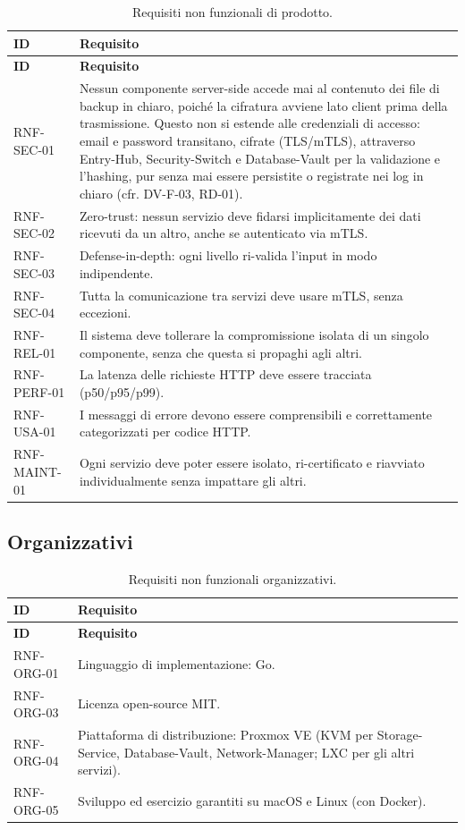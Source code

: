 \begin{longtable}{p{2.6cm} p{\dimexpr\linewidth-2.6cm-4\tabcolsep\relax}}
\caption{Requisiti non funzionali di prodotto.} \\
\hline
\textbf{ID} & \textbf{Requisito} \\
\hline
\endfirsthead
\hline
\textbf{ID} & \textbf{Requisito} \\
\hline
\endhead
\hline
\endfoot
\hline
\endlastfoot
RNF-SEC-01 & Nessun componente server-side accede mai al contenuto dei file di backup in chiaro, poiché la cifratura avviene lato client prima della trasmissione. Questo non si estende alle credenziali di accesso: email e password transitano, cifrate (TLS/mTLS), attraverso Entry-Hub, Security-Switch e Database-Vault per la validazione e l'hashing, pur senza mai essere persistite o registrate nei log in chiaro (cfr. DV-F-03, RD-01). \\
RNF-SEC-02 & Zero-trust: nessun servizio deve fidarsi implicitamente dei dati ricevuti da un altro, anche se autenticato via mTLS. \\
RNF-SEC-03 & Defense-in-depth: ogni livello ri-valida l'input in modo indipendente. \\
RNF-SEC-04 & Tutta la comunicazione tra servizi deve usare mTLS, senza eccezioni. \\
RNF-REL-01 & Il sistema deve tollerare la compromissione isolata di un singolo componente, senza che questa si propaghi agli altri. \\
RNF-PERF-01 & La latenza delle richieste HTTP deve essere tracciata (p50/p95/p99). \\
RNF-USA-01 & I messaggi di errore devono essere comprensibili e correttamente categorizzati per codice HTTP. \\
RNF-MAINT-01 & Ogni servizio deve poter essere isolato, ri-certificato e riavviato individualmente senza impattare gli altri. \\
\end{longtable}

\subsection{Organizzativi}

\begin{longtable}{p{2.6cm} p{\dimexpr\linewidth-2.6cm-4\tabcolsep\relax}}
\caption{Requisiti non funzionali organizzativi.} \\
\hline
\textbf{ID} & \textbf{Requisito} \\
\hline
\endfirsthead
\hline
\textbf{ID} & \textbf{Requisito} \\
\hline
\endhead
\hline
\endfoot
\hline
\endlastfoot
RNF-ORG-01 & Linguaggio di implementazione: Go. \\
RNF-ORG-03 & Licenza open-source MIT. \\
RNF-ORG-04 & Piattaforma di distribuzione: Proxmox VE (KVM per Storage-Service, Database-Vault, Network-Manager; LXC per gli altri servizi). \\
RNF-ORG-05 & Sviluppo ed esercizio garantiti su macOS e Linux (con Docker). \\
\end{longtable}

